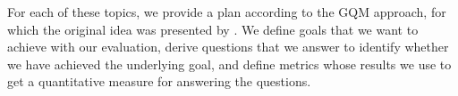 
For each of these topics, we provide a plan according to the \gls{GQM} approach, for which the original idea was presented by \textcite{basili1984GQM-TSE}.
We define goals that we want to achieve with our evaluation, derive questions that we answer to identify whether we have achieved the underlying goal, and define metrics whose results we use to get a quantitative measure for answering the questions.



